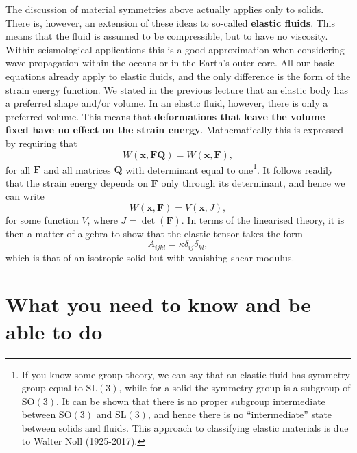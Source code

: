 \documentclass [a4paper,12pt]{paper}
\begin{document}
The discussion of material symmetries above actually applies only to solids. There is, however, an 
extension of these ideas to so-called \textbf{elastic fluids}. This means that the fluid is assumed to be compressible, 
but to have no viscosity. Within seismological applications this is a good approximation when considering wave propagation within 
the oceans or in the Earth's outer core. All our basic equations already apply to elastic fluids, and the only difference 
is the form of the strain energy function. We stated in the previous lecture that an elastic body has a preferred shape 
and/or volume. In an elastic fluid, however, there is only a preferred volume. This means that \textbf{deformations that leave the 
volume fixed have no effect on the strain energy}. Mathematically this is expressed by requiring that
\begin{equation}
W(\mathbf{x}, \mathbf{F}\mathbf{Q}) = W(\mathbf{x}, \mathbf{F}),
\end{equation}
for all $\mathbf{F}$ and all matrices $\mathbf{Q}$ with determinant equal to one\footnote{If you know some group theory, we can say that an elastic fluid has symmetry group equal to $\mathrm{SL}(3)$, while for a solid the symmetry group is a subgroup of $\mathrm{SO}(3)$. It can be shown that there is no proper subgroup intermediate between $\mathrm{SO}(3)$ and $\mathrm{SL}(3)$, and hence there is no ``intermediate'' state between solids and fluids. This approach to classifying elastic materials is due to Walter Noll (1925-2017).}. It follows readily that the strain energy depends on $\mathbf{F}$ only through its determinant, and hence we can write
\begin{equation}
W(\mathbf{x}, \mathbf{F}) = V(\mathbf{x}, J),
\end{equation}
for some function $V$, where $J = \det(\mathbf{F})$. In terms of the linearised theory, it is then a matter of algebra to show that the elastic tensor takes the form
\begin{equation}
A_{ijkl} = \kappa\delta_{ij}\delta_{kl},
\end{equation}
which is that of an isotropic solid but with vanishing shear modulus.

\section*{What you need to know and be able to do}
\end{document}
